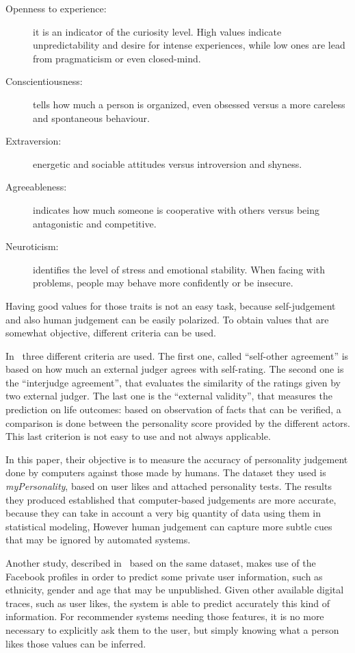 \begin{description}
	\item[Openness to experience:] it is an indicator of the curiosity level. High values indicate unpredictability and desire for intense experiences, while low ones are lead from pragmaticism or even closed-mind.
	\item[Conscientiousness:] tells how much a person is organized, even obsessed versus a more careless and spontaneous behaviour.
	\item[Extraversion:] energetic and sociable attitudes versus introversion and shyness.
	\item[Agreeableness:] indicates how much someone is cooperative with others versus being antagonistic and competitive.
	\item[Neuroticism:] identifies the level of stress and emotional stability. When facing with problems, people may behave more confidently or be insecure.
\end{description}
Having good values for those traits is not an easy task, because self-judgement and also human judgement can be easily polarized. To obtain values that are somewhat objective, different criteria can be used.

In~\cite{youyou2015computer} three different criteria are used. The first one, called ``self-other agreement''  is based on how much an external judger agrees with self-rating. The second one is the ``interjudge agreement'', that evaluates the similarity of the ratings given by two external judger. The last one is the ``external validity'', that measures the prediction on life outcomes: based on observation of facts that can be verified, a comparison is done between the personality score provided by the different actors. This last criterion is not easy to use and not always applicable.

In this paper, their objective is to measure the accuracy of personality judgement done by computers against those made by humans. The dataset they used is \textit{myPersonality}, based on user likes and attached personality tests. The results they produced established that computer-based judgements are more accurate, because they can take in account a very big quantity of data using them in statistical modeling, However human judgement can capture more subtle cues that may be ignored by automated systems.

Another study, described in~\cite{kosinski2013private} based on the same dataset, makes use of the Facebook profiles in order to predict some private user information, such as ethnicity, gender and age that may be unpublished. Given other available digital traces, such as user likes, the system is able to predict accurately this kind of information. For recommender systems needing those features, it is no more necessary to explicitly ask them to the user, but simply knowing what a person likes those values can be inferred.

